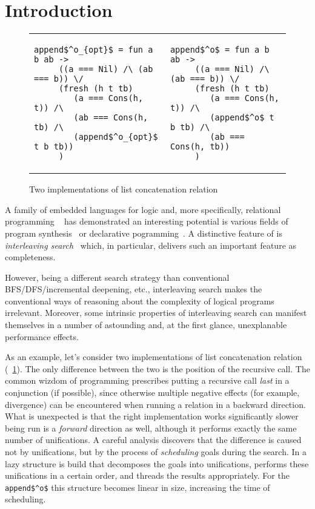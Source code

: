 \section{Introduction}
\label{sec:intro}

\begin{figure}[t]
\begin{tabular}{p{6cm}p{6cm}}
\begin{lstlisting}[basicstyle=\small]
   append$^o_{opt}$ = fun a b ab ->
     ((a === Nil) /\ (ab === b)) \/
     (fresh (h t tb)
        (a === Cons(h, t)) /\
        (ab === Cons(h, tb) /\
        (append$^o_{opt}$ t b tb)) 
     )
\end{lstlisting} &
\begin{lstlisting}[basicstyle=\small]
   append$^o$ = fun a b ab ->
     ((a === Nil) /\ (ab === b)) \/
     (fresh (h t tb)
        (a === Cons(h, t)) /\
        (append$^o$ t b tb) /\
        (ab === Cons(h, tb)) 
     )
\end{lstlisting}
\end{tabular}
\caption{Two implementations of list concatenation relation}
\label{fig:length_implementations}
\end{figure}

A family of embedded languages for logic and, more specifically, relational programming \mK~\cite{TRS} has demonstrated an interesting potential is various fields of 
program synthesis~\cite{SevenProblems,Twines,Matching} or declarative pogramming~\cite{?}. A distinctive feature of \mK is \emph{interleaving search}~\cite{Transformers} which,
in particular, delivers such an important feature as completeness.

However, being a different search strategy than conventional BFS/DFS/incremental deepening, etc., interleaving search makes the conventional ways of reasoning about the complexity
of logical programs irrelevant. Moreover, some intrinsic properties of interleaving search can manifest themselves in a number of astounding and, at the first glance, unexplanable
performance effects. 

As an example, let's consider two implementations of list concatenation relation (\figureword~\ref{fig:length_implementations}). The only difference between the two is
the position of the recursive call. The common wizdom of \mK programming prescribes putting a recursive call \emph{last} in a conjunction (if possible), since otherwise multiple
negative effects (for example, divergence) can be encountered when running a relation in a backward direction. What is unexpected is that the right implementation
works significantly slower being run is a \emph{forward} direction as well, although it performs exactly the same number of unifications. A careful analysis discovers that the difference
is caused not by unifications, but by the process of \emph{scheduling} goals during the search. In \mK a lazy structure is build that decomposes the
goals into unifications, performs these unifications in a certain order, and threads the results appropriately. For the \lstinline|append$^o$| this structure becomes linear in
size, increasing the time of scheduling.

